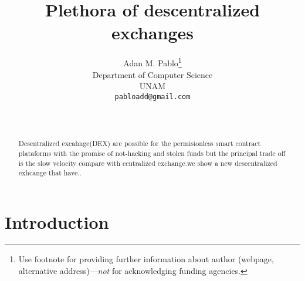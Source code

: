 \documentclass{article}
\title{Plethora of descentralized exchanges }
\author{
  Adan M. Pablo\thanks{Use footnote for providing further
    information about author (webpage, alternative
    address)---\emph{not} for acknowledging funding agencies.} \\
  Department of Computer Science\\
 UNAM\\\texttt{pabloadd@gmail.com} \\
   \And
\\
\\
}
\begin{document}
\maketitle

\begin{abstract}
Desentralized excahnge(DEX) are possible for the permisionless smart contract plataforms with the promise of not-hacking and stolen funds but the principal trade off is the slow velocity compare with centralized exchange.we show a new descentralized exhcange that have..

\end{abstract}




\section{Introduction}
\end{document}
